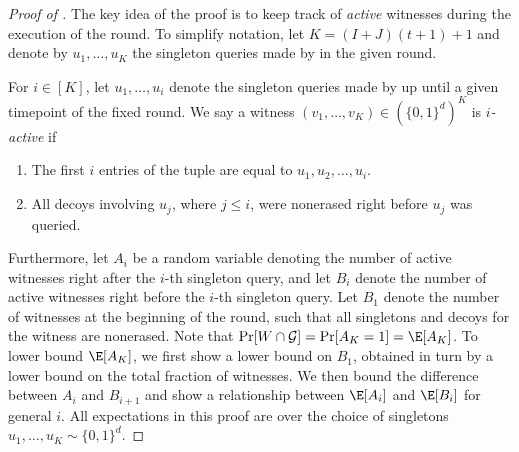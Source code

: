 \documentclass{toc}
\begin{document}
\begin{proof}[Proof of ]
    
The key idea of the proof is to keep track of \emph{active} witnesses during the execution of the round. To simplify notation, let $K = (I + J)(t+1) + 1$ and denote by $u_1, \dots, u_{K}$ the singleton queries made by  in the given round.  

\begin{definition} For $i \in [K]$, let $u_1, \dots, u_i$ denote the singleton queries made by  %
up until
a given timepoint of the fixed round. We say a witness $(v_1,\dots, v_{K}) \in (\{0,1\}^d)^{K}$ is  {\em $i$-active} if
\begin{enumerate}
    \item The first $i$ entries of the tuple are equal to $u_1, u_2, \dots, u_i$.
    \item All decoys involving $u_j$, where $j \leq i$, were nonerased right before $u_j$ was queried. 
\end{enumerate}
 
\end{definition}

Furthermore, let $A_i$ be a random variable denoting the number of active witnesses right after the $i$-th singleton query, and let $B_i$ denote the number of active witnesses right before the $i$-th singleton query. Let $B_1$ denote the number of witnesses at the beginning of the round, such that all singletons and decoys for the witness are nonerased. Note that $\Pr[W \cap \mathcal{G}] = \Pr[A_{K} = 1] = \E[A_{K}]$. To lower bound $\E[A_{K}]$, we first show a lower bound on $B_1$, obtained in turn by a lower bound on the total fraction of witnesses. We then bound the difference between $A_i$ and $B_{i+1}$ and show a relationship between $\E[A_i]$ and $\E[B_i]$ for general $i$. All expectations in this proof are over the choice of singletons $u_1, \dots, u_K \sim \{0,1\}^d$. 


\end{proof}
\end{document}
